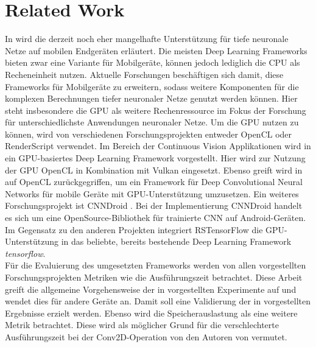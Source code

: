 \section{Related Work}
\label{sec:relatedwork}
In \cite{rstensorflow2017} wird die derzeit noch eher mangelhafte Unterstützung für tiefe neuronale Netze auf mobilen Endgeräten erläutert. Die meisten Deep Learning Frameworks bieten zwar eine Variante für Mobilgeräte, können jedoch lediglich die CPU als Recheneinheit nutzen. Aktuelle Forschungen beschäftigen sich damit, diese Frameworks für Mobilgeräte zu erweitern, sodass weitere Komponenten für die komplexen Berechnungen tiefer neuronaler Netze genutzt werden können. Hier steht insbesondere die GPU als weitere Rechenressource im Fokus der Forschung für unterschiedlichste Anwendungen neuronaler Netze. Um die GPU nutzen zu können, wird von verschiedenen Forschungsprojekten entweder OpenCL \cite{opencl} oder RenderScript \cite{renderscript} verwendet. Im Bereich der  Continuous Vision Applikationen wird in \cite{deepmon2017} ein GPU-basiertes Deep Learning Framework vorgestellt. Hier wird zur Nutzung der GPU OpenCL \cite{opencl} in Kombination mit Vulkan \cite{vulkan} eingesetzt. Ebenso greift wird in \cite{deepsense2016} auf OpenCL \cite{opencl} zurückgegriffen, um ein Framework für Deep Convolutional Neural Networks für mobile Geräte mit GPU-Unterstützung umzusetzen. Ein weiteres Forschungsprojekt ist CNNDroid \cite{cnndroid2016}. Bei der Implementierung CNNDroid handelt es sich um eine OpenSource-Bibliothek für trainierte CNN auf Android-Geräten. Im Gegensatz zu den anderen Projekten integriert RSTensorFlow die GPU-Unterstützung in das beliebte, bereits bestehende Deep Learning Framework \textit{tensorflow}. \\
Für die Evaluierung des umgesetzten Frameworks werden von allen vorgestellten Forschungsprojekten Metriken wie die Ausführungszeit betrachtet. Diese Arbeit greift die allgemeine Vorgehensweise der in \cite{rstensorflow2017} vorgestellten Experimente auf und wendet dies für andere Geräte an. Damit soll eine Validierung der in \cite{rstensorflow2017} vorgestellten Ergebnisse erzielt werden. Ebenso wird die Speicherauslastung als eine weitere Metrik betrachtet. Diese wird als möglicher Grund für die verschlechterte Ausführungszeit bei der Conv2D-Operation von den Autoren von \cite{rstensorflow2017} vermutet. 
